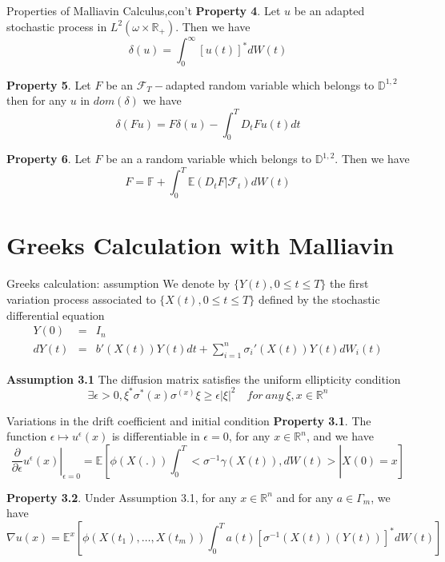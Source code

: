 \documentclass{beamer}
\begin{document}
\begin{frame}{Properties of Malliavin Calculus,con't}
\textbf{Property 4}. Let $u$ be an adapted stochastic process in $L^2(\omega \times \mathbb{R}_+)$. Then we have
$$
\delta(u) = \int_0^\infty [u(t)]^* dW(t)
$$

\textbf{Property 5}. Let $F$ be an $\mathcal{F}_T-$adapted random variable which belongs to $\mathbb{D}^{1,2}$ then for any $u$ in $dom(\delta)$ we have
$$
\delta(Fu) = F\delta(u) - \int_0^T D_t F u(t) dt
$$

\textbf{Property 6}. Let $F$ be an a random variable which belongs to $\mathbb{D}^{1,2}$. Then we have
$$
F = \mathbb{F} + \int_0^T \mathbb{E}(D_tF|\mathcal{F}_t) dW(t)
$$
\end{frame}



\section{Greeks Calculation with Malliavin}

\begin{frame}{Greeks calculation: assumption}
We denote by $\{Y(t), 0 \leq t \leq T\}$ the first variation process associated to $\{X(t), 0 \leq t \leq T\}$ defined by the stochastic differential equation
\begin{eqnarray*}
Y(0)  &=& I_n \\
dY(t) &=& b'(X(t))Y(t)dt + \sum_{i=1}^n \sigma_i'(X(t)) Y(t) dW_i(t)
\end{eqnarray*}

\textbf{Assumption 3.1} The diffusion matrix  satisfies the uniform ellipticity condition
$$
\exists \epsilon >0, \xi^* \sigma^*(x)\sigma^(x)\xi \geq \epsilon |\xi|^2 \quad for~any~\xi,x \in \mathbb{R}^n
$$
\end{frame}


\begin{frame}{Variations in the drift coefficient and initial condition}
\textbf{Property 3.1}. The function $\epsilon \mapsto u^\epsilon(x)$ is differentiable in $\epsilon = 0$, for any $x\in \mathbb{R}^n$, and we have
$$
\left. \frac{\partial}{\partial \epsilon} u^\epsilon(x) \right|_{\epsilon=0} = \mathbb{E}\left[ \left. \phi(X(.))\int_0^T <\sigma^{-1}\gamma(X(t)),dW(t)> \right| X(0) = x \right]
$$

\textbf{Property 3.2}. Under Assumption 3.1, for any $x\in \mathbb{R}^n$ and for any $a\in\Gamma_m$, we
have
$$
\nabla u(x) = \mathbb{E}^x \left[ \phi(X(t_1),\ldots,X(t_m))\int_0^T a(t)[\sigma^{-1}(X(t))(Y(t))]^*dW(t)  \right]
$$
\end{frame}
\end{document}
